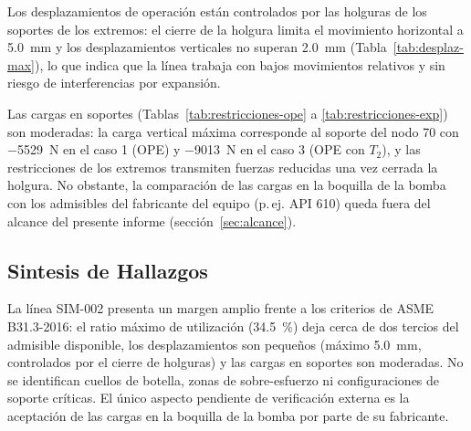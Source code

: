 Los desplazamientos de operaci\'{o}n est\'{a}n controlados por las holguras de
los soportes de los extremos: el cierre de la holgura limita el movimiento
horizontal a 5.0~\si{mm} y los desplazamientos verticales no superan
2.0~\si{mm} (Tabla~\ref{tab:desplaz-max}), lo que indica que la l\'{i}nea
trabaja con bajos movimientos relativos y sin riesgo de interferencias por
expansi\'{o}n.

Las cargas en soportes (Tablas~\ref{tab:restricciones-ope} a
\ref{tab:restricciones-exp}) son moderadas: la carga vertical m\'{a}xima
corresponde al soporte del nodo 70 con \num{-5529}~\si{N} en el caso 1 (OPE) y
\num{-9013}~\si{N} en el caso 3 (OPE con $T_2$), y las restricciones de los
extremos transmiten fuerzas reducidas una vez cerrada la holgura. No obstante,
la comparaci\'{o}n de las cargas en la boquilla de la bomba con los admisibles
del fabricante del equipo (p.\,ej. API 610) queda fuera del alcance del
presente informe (secci\'{o}n~\ref{sec:alcance}).

\subsection{Sintesis de Hallazgos}

La l\'{i}nea SIM-002 presenta un margen amplio frente a los criterios de
ASME B31.3-2016: el ratio m\'{a}ximo de utilizaci\'{o}n (34.5~\%) deja cerca
de dos tercios del admisible disponible, los desplazamientos son peque\~{n}os
(m\'{a}ximo 5.0~\si{mm}, controlados por el cierre de holguras) y las cargas en
soportes son moderadas. No se identifican cuellos de botella, zonas de
sobre-esfuerzo ni configuraciones de soporte cr\'{i}ticas. El \'{u}nico aspecto
pendiente de verificaci\'{o}n externa es la aceptaci\'{o}n de las cargas en la
boquilla de la bomba por parte de su fabricante.
